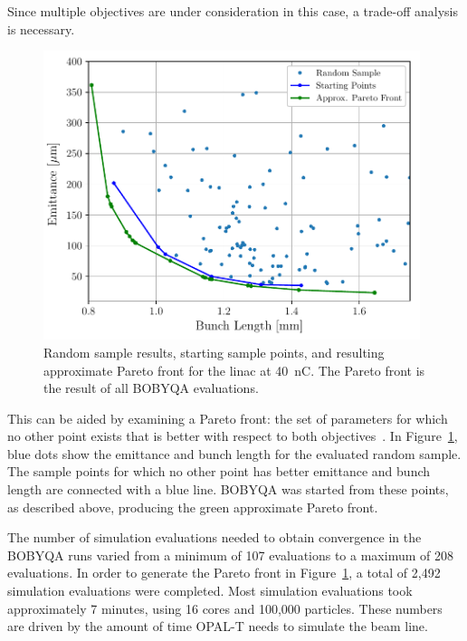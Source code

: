 \documentclass{iitthesis}
\begin{document}
Since multiple objectives are under consideration in this case, a
trade-off analysis is necessary. 
\begin{figure}[h]
	\captionsetup{width=0.98\linewidth}
	\begin{center}
		\includegraphics[width=0.98\textwidth]{images/THPAB155f1}
		\caption{Random sample results, starting sample points, and resulting approximate Pareto front for the linac at \SI{40}{nC}. The Pareto front is the result of all BOBYQA evaluations.}
		\label{fig:pareto}
	\end{center}
\end{figure}
This can be aided by examining a Pareto front: the set of parameters 
for which no other point exists that is better with respect to both objectives~\cite{ehrgott2006multicriteria}.
In Figure~\ref{fig:pareto}, blue dots show the emittance and bunch length for the
evaluated random sample. The sample points for which no other point has better
emittance and bunch length are connected with a blue line. BOBYQA was started
from these points, as described above, producing the green approximate Pareto front. 


The number of simulation evaluations needed to obtain convergence
in the BOBYQA runs varied from a minimum of 107 evaluations to a maximum of 208 
evaluations. In order to generate the Pareto front in
Figure~\ref{fig:pareto}, a total of 2,492 simulation evaluations were completed.
Most simulation evaluations took approximately 7 minutes, using 16 cores and 100,000 particles. These numbers are driven by the amount of time OPAL-T needs to simulate the beam line. 
\end{document}
